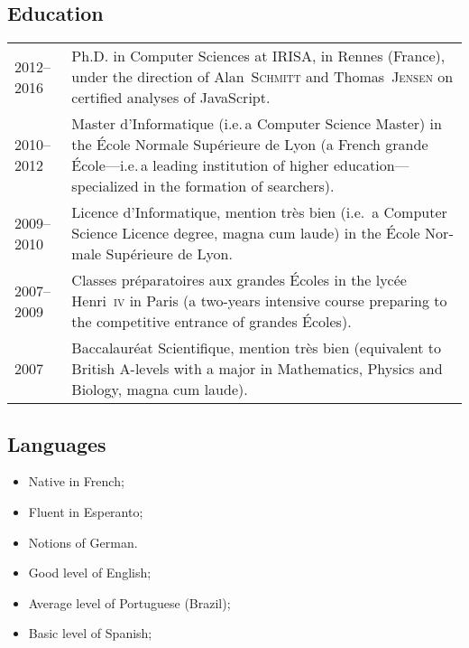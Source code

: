 \documentclass[12pt,a4paper]{article}
\makeatletter
\newcommand{\fr}[1]{\foreignlanguage{french}{{#1}}}
\newcommand{\fr}[1]{\foreignlanguage{francais}{{#1}}}
\newcommand{\ie}{i.e.\,}
\newenvironment{datecvsection}[1]%
               {\subsection*{#1}%
                 \noindent \begin{tabular}{@{}p{\annee}p{\texte}@{}}}
               {\end{tabular}}
\newenvironment{cvsection}[1]%
               {\subsection*{#1}}
               {}
\newcommand\familyName{\textsc}
\newcommand\placeName{}
\makeatother
\begin{document}
\begin{datecvsection}{Education}

    2012–2016 & Ph.D. in Computer Sciences at \placeName{IRISA}, in \placeName{Rennes} (\placeName{France}), under the direction of Alan~\familyName{Schmitt} and Thomas~\familyName{Jensen} on certified analyses of JavaScript. \\

	2010–2012 & \fr{Master d’Informatique} (\ie a Computer Science
    Master) in the \fr{\placeName{École Normale Supérieure de Lyon}} (a French
	\fr{grande École}—\ie a leading institution of higher
    education—specialized in the formation of searchers). \\

	2009–2010 & \fr{Licence d’Informatique, mention très bien} (\ie
	a Computer Science Licence degree, magna cum laude) in the
    \fr{\placeName{École Normale Supérieure de Lyon}}. \\

	2007–2009 & \fr{Classes préparatoires aux grandes Écoles} in the
    \fr{\placeName{lycée Henri~\textsc{iv}}} in Paris (a two-years intensive course
	preparing to the competitive entrance of \fr{grandes Écoles}). \\

	2007 & \fr{Baccalauréat Scientifique, mention très bien}
	(equivalent to British A-levels with a major in Mathematics, Physics
	and Biology, magna cum laude). \\

\end{datecvsection}

\begin{cvsection}{Languages}
\parbox{.4\textwidth}{
\begin{itemize}
   \item Native in French;
   \item Fluent in Esperanto;
   \item Notions of German.
\end{itemize}}
\parbox{.5\textwidth}{
\begin{itemize}
   \item Good level of English;
	 \item Average level of Portuguese (Brazil);
   \item Basic level of Spanish;
\end{itemize}
}
\end{cvsection}
\end{document}
